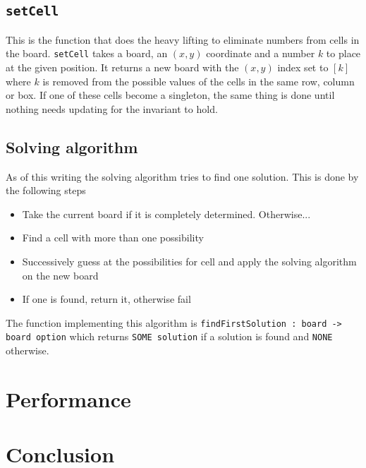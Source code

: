 \documentclass[12pt, a4paper]{article}
\begin{document}
\subsection{\texttt{setCell}}

This is the function that does the heavy lifting to eliminate numbers from cells in the board. \texttt{setCell} takes a board, an $(x,y)$ coordinate and a number $k$ to place at the given position. It returns a new board with the $(x,y)$ index set to $[k]$ where $k$ is removed from the possible values of the cells in the same row, column or box. If one of these cells become a singleton, the same thing is done until nothing needs updating for the invariant to hold.

\subsection{Solving algorithm}

As of this writing the solving algorithm tries to find one solution. This is done by the following steps

\begin{itemize}
\item Take the current board if it is completely determined. Otherwise...
\item Find a cell with more than one possibility
\item Successively guess at the possibilities for cell and
        apply the solving algorithm on the new board
\item If one is found, return it, otherwise fail
\end{itemize}

The function implementing this algorithm is \texttt{findFirstSolution : board -> board option} which returns \texttt{SOME solution} if a solution is found and \texttt{NONE} otherwise.

\section{Performance}

\section{Conclusion}
\end{document}
